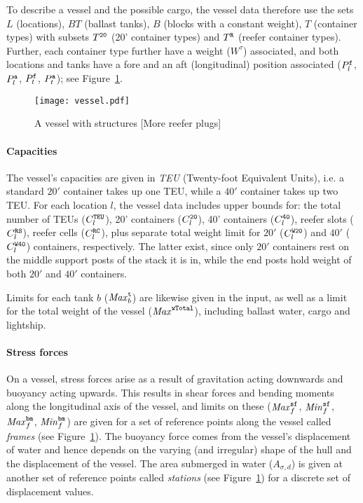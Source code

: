 To describe a vessel and the possible cargo, the vessel data therefore use the sets $L$ (locations), $BT$ (ballast tanks), $B$ (blocks with a constant weight), $T$ (container types) with subsets $T^{\texttt{20}}$ (20' container types) and $T^{\texttt{R}}$ (reefer container types). Further, each container type further have a weight ($W^\tau$) associated, and both locations and tanks have a fore and an aft (longitudinal) position associated ($P^{\texttt{f}}_l$, $P^{\texttt{a}}_l$, $P^{\texttt{f}}_t$, $P^{\texttt{a}}_t$); see Figure~\ref{fig:vessel}.    

\begin{figure}
	\centering
		\texttt{[image: vessel.pdf]}
	\caption{A vessel with structures [More reefer plugs]}
	\label{fig:vessel}
\end{figure}

\paragraph{Capacities}
The vessel's capacities are given in \emph{TEU} (Twenty-foot Equivalent Units), i.e. a standard $20'$ container takes up one TEU, while a $40'$ container takes up two TEU. For each location $l$, the vessel data includes upper bounds for: the total number of TEUs ($C^{\texttt{TEU}}_l$), 20' containers ($C^{\texttt{20}}_l$), 40' containers ($C^{\texttt{40}}_l$), reefer slots ($C^{\texttt{RS}}_l$), reefer cells ($C^{\texttt{RC}}_l$), plus separate total weight limit for $20'$ ($C^{\texttt{W20}}_l$) and $40'$ ($C^{\texttt{W40}}_l$) containers, respectively. The latter exist, since only $20'$ containers rest on the middle support posts of the stack it is in, while the end posts hold weight of both $20'$ and $40'$ containers. 

Limits for each tank $b$ ($\mathit{Max}^{\texttt{t}}_b$) are likewise given in the input, as well as a limit for the total weight of the vessel ($\mathit{Max}^{\texttt{wTotal}}$), including ballast water, cargo and lightship. 

\paragraph{Stress forces}
On a vessel, stress forces arise as a result of gravitation acting downwards and buoyancy acting upwards. This results in shear forces and bending moments along the longitudinal axis of the vessel, and limits on these ($\mathit{Max}^{\texttt{sf}}_f$, $\mathit{Min}^{\texttt{sf}}_f$, $\mathit{Max}^{\texttt{bm}}_f$, $\mathit{Min}^{\texttt{bm}}_f$) are given for a set of reference points along the vessel called \emph{frames} (see Figure~\ref{fig:vessel}). 
%
The buoyancy force comes from the vessel's displacement of water and hence depends on the varying (and irregular) shape of the hull and the displacement of the vessel. The area submerged in water ($A_{\sigma,d}$) is given at another set of reference points called \emph{stations} (see Figure~\ref{fig:vessel}) for a discrete set of displacement values.   

